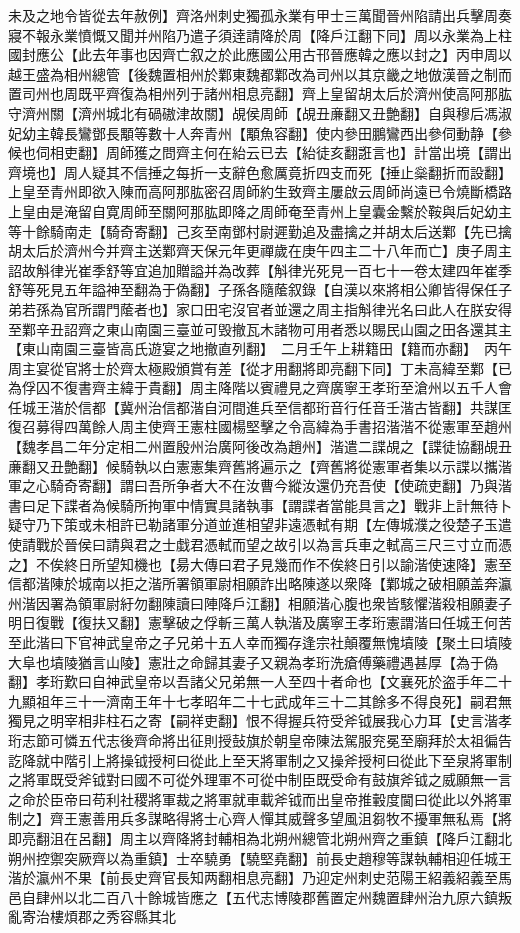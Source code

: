 未及之地令皆從去年赦例】齊洛州刺史獨孤永業有甲士三萬聞晉州陷請出兵擊周奏寢不報永業憤慨又聞并州陷乃遣子須逹請降於周【降戶江翻下同】周以永業為上柱國封應公【此去年事也因齊亡叙之於此應國公用古邗晉應韓之應以封之】丙申周以越王盛為相州總管【後魏置相州於鄴東魏都鄴改為司州以其京畿之地倣漢晉之制而置司州也周既平齊復為相州列于諸州相息亮翻】齊上皇留胡太后於濟州使高阿那肱守濟州關【濟州城北有碢磝津故關】覘侯周師【覘丑亷翻又丑艶翻】自與穆后馮淑妃幼主韓長鸞鄧長顒等數十人奔青州【顒魚容翻】使内參田鵬鸞西出參伺動静【參候也伺相吏翻】周師獲之問齊主何在紿云已去【紿徒亥翻誑言也】計當出境【謂出齊境也】周人疑其不信捶之每折一支辭色愈厲竟折四支而死【捶止橤翻折而設翻】上皇至青州即欲入陳而高阿那肱密召周師約生致齊主屢啟云周師尚遠已令燒斷橋路上皇由是淹留自寛周師至關阿那肱即降之周師奄至青州上皇囊金繫於鞍與后妃幼主等十餘騎南走【騎奇寄翻】己亥至南鄧村尉遲勤追及盡擒之并胡太后送鄴【先已擒胡太后於濟州今并齊主送鄴齊天保元年更禪歲在庚午四主二十八年而亡】庚子周主詔故斛律光崔季舒等宜追加贈謚并為改葬【斛律光死見一百七十一卷太建四年崔季舒等死見五年謚神至翻為于偽翻】子孫各隨䕃叙錄【自漢以來將相公卿皆得保任子弟若孫為官所謂門䕃者也】家口田宅沒官者並還之周主指斛律光名曰此人在朕安得至鄴辛丑詔齊之東山南園三臺並可毁撤瓦木諸物可用者悉以賜民山園之田各還其主【東山南園三臺皆高氏遊宴之地撤直列翻】　二月壬午上耕籍田【籍而亦翻】　丙午周主宴從官將士於齊太極殿頒賞有差【從才用翻將即亮翻下同】丁未高緯至鄴【已為俘囚不復書齊主緯于貴翻】周主降階以賓禮見之齊廣寧王孝珩至滄州以五千人會任城王湝於信都【冀州治信都湝自河間進兵至信都珩音行任音壬湝古皆翻】共謀匡復召募得四萬餘人周主使齊王憲柱國楊堅擊之令高緯為手書招湝湝不從憲軍至趙州【魏孝昌二年分定相二州置殷州治廣阿後改為趙州】湝遣二諜覘之【諜徒協翻覘丑亷翻又丑艶翻】候騎執以白憲憲集齊舊將遍示之【齊舊將從憲軍者集以示諜以攜湝軍之心騎奇寄翻】謂曰吾所争者大不在汝曹今縱汝還仍充吾使【使疏吏翻】乃與湝書曰足下諜者為候騎所拘軍中情實具諸執事【謂諜者當能具言之】戰非上計無待卜疑守乃下策或未相許已勒諸軍分道並進相望非遠憑軾有期【左傳城濮之役楚子玉遣使請戰於晉侯曰請與君之士戱君憑軾而望之故引以為言兵車之軾高三尺三寸立而憑之】不俟終日所望知機也【昜大傳曰君子見幾而作不俟終日引以諭湝使速降】憲至信都湝陳於城南以拒之湝所署領軍尉相願詐出略陳遂以衆降【鄴城之破相願盖奔瀛州湝因署為領軍尉紆勿翻陳讀曰陣降戶江翻】相願湝心腹也衆皆駭懼湝殺相願妻子明日復戰【復扶又翻】憲擊破之俘斬三萬人執湝及廣寧王孝珩憲謂湝曰任城王何苦至此湝曰下官神武皇帝之子兄弟十五人幸而獨存逢宗社顛覆無愧墳陵【聚土曰墳陵大阜也墳陵猶言山陵】憲壯之命歸其妻子又親為孝珩洗瘡傅藥禮遇甚厚【為于偽翻】孝珩歎曰自神武皇帝以吾諸父兄弟無一人至四十者命也【文襄死於盗手年二十九顯祖年三十一濟南王年十七孝昭年二十七武成年三十二其餘多不得良死】嗣君無獨見之明宰相非柱石之寄【嗣祥吏翻】恨不得握兵符受斧钺展我心力耳【史言湝孝珩志節可憐五代志後齊命將出征則授鼔旗於朝皇帝陳法駕服兖冕至廟拜於太祖徧告訖降就中階引上將操钺授柯曰從此上至天將軍制之又操斧授柯曰從此下至泉將軍制之將軍既受斧钺對曰國不可從外理軍不可從中制臣既受命有鼓旗斧钺之威願無一言之命於臣帝曰苟利社稷將軍裁之將軍就車載斧钺而出皇帝推轂度閫曰從此以外將軍制之】齊王憲善用兵多謀略得將士心齊人憚其威聲多望風沮芻牧不擾軍無私焉【將即亮翻沮在呂翻】周主以齊降將封輔相為北朔州總管北朔州齊之重鎮【降戶江翻北朔州控禦突厥齊以為重鎮】士卒驍勇【驍堅堯翻】前長史趙穆等謀執輔相迎任城王湝於瀛州不果【前長史齊官長知两翻相息亮翻】乃迎定州刺史范陽王紹義紹義至馬邑自肆州以北二百八十餘城皆應之【五代志博陵郡舊置定州魏置肆州治九原六鎮叛亂寄治樓煩郡之秀容縣其北